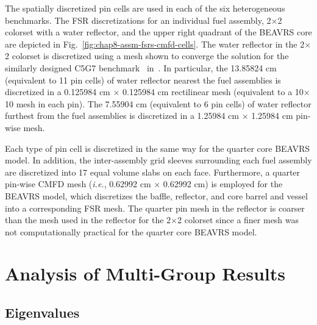 The spatially discretized pin cells are used in each of the six heterogeneous benchmarks. The \ac{FSR} discretizations for an individual fuel assembly, 2$\times$2 colorset with a water reflector, and the upper right quadrant of the \ac{BEAVRS} core are depicted in Fig.~\ref{fig:chap8-assm-fsrs-cmfd-cells}. The water reflector in the 2$\times$2 colorset is discretized using a mesh shown to converge the solution for the similarly designed C5G7 benchmark~\cite{lewis2003c5g7} in~\cite{boyd2014ms}. In particular, the 13.85824 cm (equivalent to 11 pin cells) of water reflector nearest the fuel assemblies is discretized in a 0.125984 cm $\times$ 0.125984 cm rectilinear mesh (equivalent to a 10$\times$10 mesh in each pin). The 7.55904 cm (equivalent to 6 pin cells) of water reflector furthest from the fuel assemblies is discretized in a 1.25984 cm $\times$ 1.25984 cm pin-wise mesh.

Each type of pin cell is discretized in the same way for the quarter core \ac{BEAVRS} model. In addition, the inter-assembly grid sleeves surrounding each fuel assembly are discretized into 17 equal volume slabs on each face. Furthermore, a quarter pin-wise \ac{CMFD} mesh (\textit{i.e.}, 0.62992 cm $\times$ 0.62992 cm) is employed for the \ac{BEAVRS} model, which discretizes the baffle, reflector, and core barrel and vessel into a corresponding \ac{FSR} mesh. The quarter pin mesh in the reflector is coarser than the mesh used in the reflector for the 2$\times$2 colorset since a finer mesh was not computationally practical for the quarter core \ac{BEAVRS} model.


\section{Analysis of Multi-Group Results}
\label{sec:chap8-mg-results}


\subsection{Eigenvalues}
\label{subsec:chap8-eigenvalues}

